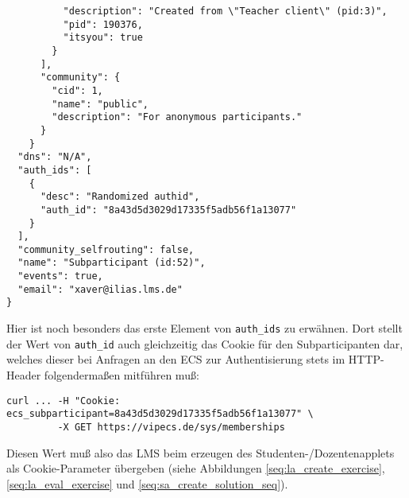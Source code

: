 \documentclass[dvips,12pt,a4paper]{article}
\begin{document}
\begin{verbatim}
          "description": "Created from \"Teacher client\" (pid:3)",                                                                                                                        
          "pid": 190376,                                                                                                                                                                   
          "itsyou": true                                                                                                                                                                   
        }                                                                                                                                                                                  
      ],                                                                                                                                                                                   
      "community": {                                                                                                                                                                       
        "cid": 1,                                                                                                                                                                          
        "name": "public",                                                                                                                                                                  
        "description": "For anonymous participants."                                                                                                                                       
      }                                                                                                                                                                                    
    } 
  "dns": "N/A",
  "auth_ids": [
    {
      "desc": "Randomized authid",
      "auth_id": "8a43d5d3029d17335f5adb56f1a13077"
    }
  ],
  "community_selfrouting": false,
  "name": "Subparticipant (id:52)",
  "events": true,
  "email": "xaver@ilias.lms.de"
}
\end{verbatim}
Hier ist noch besonders das erste Element von \texttt{auth\_ids} zu erwähnen.
Dort stellt der Wert von \texttt{auth\_id} auch gleichzeitig das Cookie für den
Subparticipanten dar, welches dieser bei Anfragen an den ECS zur
Authentisierung stets im HTTP-Header folgendermaßen mitführen muß:
\begin{verbatim}
curl ... -H "Cookie: ecs_subparticipant=8a43d5d3029d17335f5adb56f1a13077" \
         -X GET https://vipecs.de/sys/memberships
\end{verbatim}
Diesen Wert muß also das LMS beim erzeugen des Studenten-/Dozentenapplets als
Cookie-Parameter übergeben (siehe Abbildungen \ref{seq:la_create_exercise},
\ref{seq:la_eval_exercise} und \ref{seq:sa_create_solution_seq}).\medskip
\end{document}
